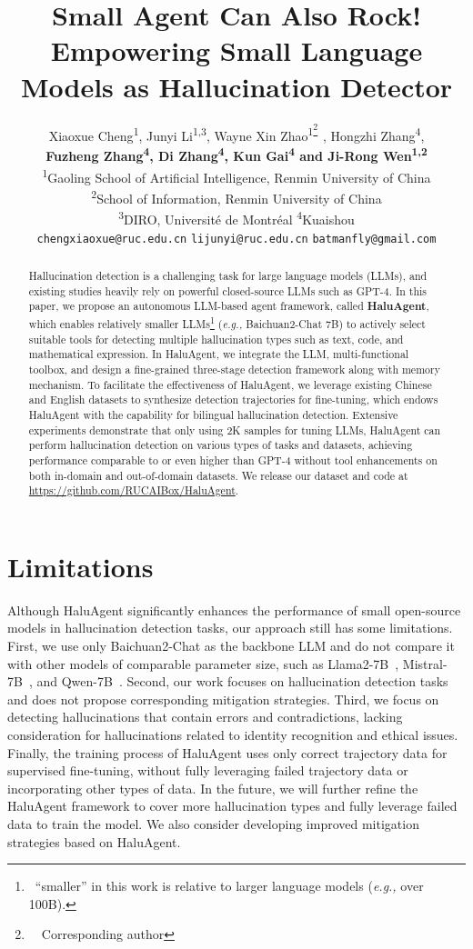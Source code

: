 \documentclass[11pt]{article}
\title{Small Agent Can Also Rock! Empowering Small Language Models as Hallucination Detector}
\author{
	Xiaoxue Cheng\textsuperscript{\rm{1}}, 
	Junyi Li\textsuperscript{\rm{1,3}},
        Wayne Xin Zhao\textsuperscript{\rm{1}\thanks{\ \ Corresponding author}\ },
        Hongzhi Zhang\textsuperscript{\rm{4}}, \\
        \textbf{Fuzheng Zhang\textsuperscript{\rm{4}}, 
        Di Zhang\textsuperscript{\rm{4}}, 
        Kun Gai\textsuperscript{\rm{4}} {\rm and} 
	Ji-Rong Wen\textsuperscript{\rm{1,2}}} \\
	\textsuperscript{1}Gaoling School of Artificial Intelligence, Renmin University of China \\
	\textsuperscript{2}School of Information, Renmin University of China \\
	\textsuperscript{3}DIRO, Universit\'{e} de Montr\'{e}al 
        \textsuperscript{4}Kuaishou \\
	\texttt{chengxiaoxue@ruc.edu.cn} \quad
        \texttt{lijunyi@ruc.edu.cn} \quad
	\texttt{batmanfly@gmail.com} \\
}
\newcommand{\eg}{\emph{e.g.,}\xspace}
\begin{document}
\maketitle
\begin{abstract}
Hallucination detection is a challenging task for large language models (LLMs), and existing studies heavily rely on powerful closed-source LLMs such as GPT-4. In this paper, we propose an autonomous LLM-based agent framework, called \textbf{HaluAgent}, which enables relatively smaller LLMs\footnote{~``smaller'' in this work is relative to larger language models (\eg over 100B).} (\eg Baichuan2-Chat 7B) to actively select suitable tools for detecting multiple hallucination types such as text, code, and mathematical expression. In HaluAgent, we integrate the LLM, multi-functional toolbox, and design a fine-grained three-stage detection framework along with memory mechanism. 
To facilitate the effectiveness of HaluAgent, we leverage existing Chinese and English datasets to synthesize detection trajectories for fine-tuning, which endows HaluAgent with the capability for bilingual hallucination detection.
Extensive experiments demonstrate that only using 2K samples for tuning LLMs, HaluAgent can perform hallucination detection on various types of tasks and datasets, achieving performance comparable to or even higher than GPT-4 without tool enhancements on both in-domain and out-of-domain datasets.
We release our dataset and code at \url{https://github.com/RUCAIBox/HaluAgent}.
\end{abstract}











\section*{Limitations}
Although HaluAgent significantly enhances the performance of small open-source models in hallucination detection tasks, our approach still has some limitations. 
First, we use only Baichuan2-Chat as the backbone LLM and do not compare it with other models of comparable parameter size, such as Llama2-7B~\cite{touvron2023llama}, Mistral-7B~\cite{jiang2023mistral}, and Qwen-7B~\cite{qwen}. 
Second, our work focuses on hallucination detection tasks and does not propose corresponding mitigation strategies.
Third, we focus on detecting hallucinations that contain errors and contradictions, lacking consideration for hallucinations related to identity recognition and ethical issues.
Finally, the training process of HaluAgent uses only correct trajectory data for supervised fine-tuning, without fully leveraging failed trajectory data or incorporating other types of data. 
In the future, we will further refine the HaluAgent framework to cover more hallucination types and fully leverage failed data to train the model. We also consider developing improved mitigation strategies based on HaluAgent.
\end{document}
